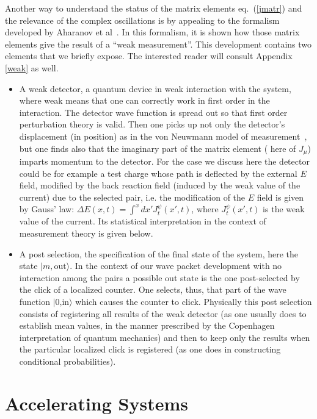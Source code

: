 \documentclass[12pt,oneside]{report}
\def\ket#1{|#1\rangle}
\begin{document}
Another way to understand the status of the matrix elements eq.~(\ref{jmatr})
and the relevance of the complex oscillations 
is by appealing to the formalism developed by Aharanov et al~\cite{Ahar}.
 In this formalism, it is shown how those matrix elements 
give the result of a ``weak measurement''.
 This
development contains two
elements that we briefly expose. The interested reader will consult 
Appendix \ref{weak}
as well.
\begin{itemize}
\item A weak detector, a quantum 
device in weak interaction with the system, where
weak
means that one can correctly work
in first order in the interaction. The 
detector wave function is
spread out 
so that first order perturbation theory is valid.
Then one picks 
up not only 
the detector's displacement (in position)  
as in the von Neuwmann  model  of
measurement~\cite{Vonn}, but 
one finds also that the imaginary part of the matrix element ( here of
$J_{\mu}$) imparts
 momentum to the detector.
For the case we discuss here the detector could be for
example a test
charge whose path is deflected by the external $E$ field, modified by the
back reaction field (induced by the weak value of the current) 
due to the selected pair, i.e. the modification of the $E$ field is given 
by Gauss' law: $\Delta E(x,t)= \int^x dx' J_t^{\psi} (x',t)$, where
$J_t^{\psi} (x',t)
$ is the weak value of the current. Its statistical interpretation in the
context of measurement theory is given below. \item A post selection, the
specification of the final state of the system, here the state
$\ket{m,\mbox{out}}$. In the context of our wave packet development 
with
no
interaction among the
pairs a possible out state is 
the one
post-selected by the click of a localized counter.
One selects, thus, that part of the wave function $\ket {\mbox{0,in}}$ which causes the
counter to click.
 Physically this post selection consists 
of registering all results 
of the weak detector
(as one usually does to establish mean values, in the manner prescribed by
the
Copenhagen interpretation of quantum mechanics)
and then to keep only the results 
when the particular localized click is registered
 (as one does in constructing  conditional 
probabilities).
\end{itemize}






\chapter{Accelerating Systems}\label{ACCEL}
\end{document}
